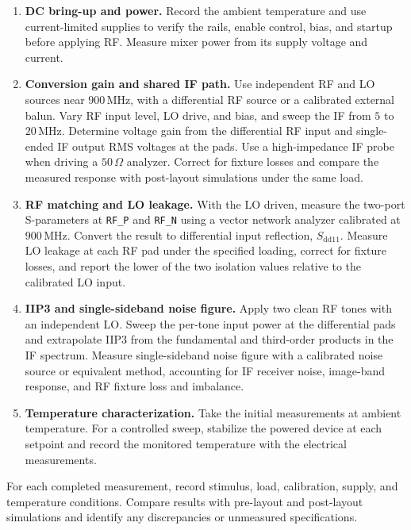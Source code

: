\begin{enumerate}
    \item \textbf{DC bring-up and power.}
    Record the ambient temperature and use current-limited supplies to verify the rails, enable control, bias, and startup before applying RF.
    Measure mixer power from its supply voltage and current.

    \item \textbf{Conversion gain and shared IF path.}
    Use independent RF and LO sources near \(900\,\mathrm{MHz}\), with a differential RF source or a calibrated external balun.
    Vary RF input level, LO drive, and bias, and sweep the IF from \(5\) to \(20\,\mathrm{MHz}\).
    Determine voltage gain from the differential RF input and single-ended IF output RMS voltages at the pads.
    Use a high-impedance IF probe when driving a \(50\,\Omega\) analyzer.
    Correct for fixture losses and compare the measured response with post-layout simulations under the same load.

    \item \textbf{RF matching and LO leakage.}
    With the LO driven, measure the two-port S-parameters at \texttt{RF\_P} and \texttt{RF\_N} using a vector network analyzer calibrated at \(900\,\mathrm{MHz}\). Convert the result to differential input reflection, \(S_{\mathrm{dd}11}\).
    Measure LO leakage at each RF pad under the specified loading, correct for fixture losses, and report the lower of the two isolation values relative to the calibrated LO input.

    \item \textbf{IIP3 and single-sideband noise figure.}
    Apply two clean RF tones with an independent LO. Sweep the per-tone input power at the differential pads and extrapolate IIP3 from the fundamental and third-order products in the IF spectrum.
    Measure single-sideband noise figure with a calibrated noise source or equivalent method, accounting for IF receiver noise, image-band response, and RF fixture loss and imbalance.

    \item \textbf{Temperature characterization.}
    Take the initial measurements at ambient temperature. For a controlled sweep, stabilize the powered device at each setpoint and record the monitored temperature with the electrical measurements.
\end{enumerate}

For each completed measurement, record stimulus, load, calibration, supply, and temperature conditions. Compare results with pre-layout and post-layout simulations and identify any discrepancies or unmeasured specifications.
